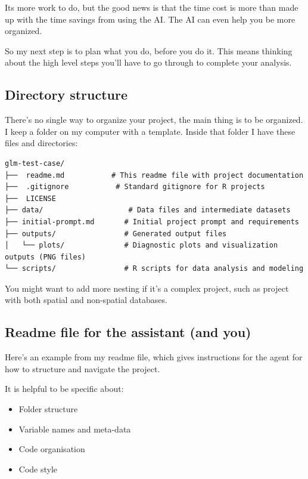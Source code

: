 \documentclass[
  letterpaper,
  DIV=11,
  numbers=noendperiod]{scrreprt}
\providecommand{\tightlist}{%
  \setlength{\itemsep}{0pt}\setlength{\parskip}{0pt}}\usepackage{longtable,booktabs,array}
\begin{document}
Its more work to do, but the good news is that the time cost is more
than made up with the time savings from using the AI. The AI can even
help you be more organized.

So my next step is to plan what you do, before you do it. This means
thinking about the high level steps you'll have to go through to
complete your analysis.

\subsection{Directory structure}\label{directory-structure}

There's no single way to organize your project, the main thing is to be
organized. I keep a folder on my computer with a template. Inside that
folder I have these files and directories:

\begin{verbatim}
glm-test-case/
├──  readme.md           # This readme file with project documentation
├──  .gitignore           # Standard gitignore for R projects
├──  LICENSE
├── data/                    # Data files and intermediate datasets
├── initial-prompt.md       # Initial project prompt and requirements
├── outputs/                # Generated output files
│   └── plots/              # Diagnostic plots and visualization outputs (PNG files)
└── scripts/                # R scripts for data analysis and modeling
\end{verbatim}

You might want to add more nesting if it's a complex project, such as
project with both spatial and non-spatial databases.

\subsection{Readme file for the assistant (and
you)}\label{readme-file-for-the-assistant-and-you}

Here's an example from my readme file, which gives instructions for the
agent for how to structure and navigate the project.

It is helpful to be specific about:

\begin{itemize}
\tightlist
\item
  Folder structure
\item
  Variable names and meta-data
\item
  Code organisation
\item
  Code style
\end{itemize}
\end{document}
